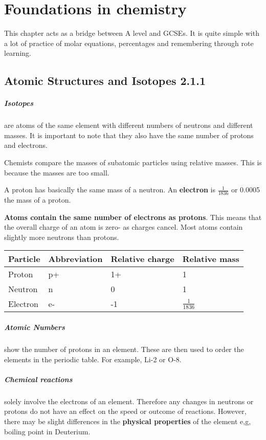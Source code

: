 \chapter{Foundations in chemistry}
    This chapter acts as a bridge between A level and GCSEs. It is quite       simple with a lot of practice of molar equations, percentages and           remembering through rote learning.
    
\section{Atomic Structures and Isotopes 2.1.1}
      \paragraph{Isotopes}are atoms of the same element with different numbers of neutrons and different masses. It is important to note that they also have the same number of protons and electrons.
      
Chemists compare the masses of subatomic particles using relative masses. This is because the masses are too small.

A proton has basically the same mass of a neutron. An \textbf{electron} is \textbf{\( \frac{1}{1836} \)} or 0.0005 the mass of a proton.

\textbf{Atoms contain the same number of electrons as protons}. This means that the overall charge of an atom is zero- as charges cancel. Most atoms contain slightly more neutrons than protons.



\begin{tabular}{ |p{3cm}||p{3cm}|p{3cm}|p{3cm}|  }
 \hline
 Particle    & Abbreviation &Relative charge&Relative mass\\
 \hline
 Proton   & p+    &1+&   1\\
 Neutron& n  & 0   &1\\
 Electron& e-  & -1&\(\frac{1}{1836} \)\\
 \hline
\end{tabular}

\paragraph{Atomic Numbers}show the number of protons in an element. These are then used to order the elements in the periodic table. For example, Li-2 or O-8.

\paragraph{Chemical reactions} solely involve the electrons of an element. Therefore any changes in neutrons or protons do not have an effect on the speed or outcome of reactions. However, there may be slight differences in the \textbf{physical properties} of the element e,g, boiling point in Deuterium.
